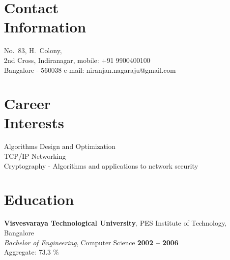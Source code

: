 \documentclass[a4paper,margin,line]{resume}
\begin{document}
\begin{resume}

    \section{\mysidestyle Contact\\Information}

    No.\ 83, H.\ Colony,		                      	\hfill									   \vspace{0mm}\\\vspace{0mm}%
    2nd Cross, Indiranagar,                       	\hfill mobile: +91 9900400100			   \vspace{0mm}\\\vspace{0mm}%
    Bangalore - 560038								\hfill e-mail: niranjan.nagaraju@gmail.com \vspace{0mm}\\\vspace{-4.5mm}%


    \section{\mysidestyle Career\\Interests}

    Algorithms Design and Optimization  \vspace{1mm}\\%
	TCP/IP Networking \vspace{1mm}\\%
	Cryptography - Algorithms and applications to network security


    \section{\mysidestyle Education}

    \textbf{Visvesvaraya Technological University}, PES Institute of Technology, Bangalore \vspace{1mm}\\%
    \textsl{Bachelor of Engineering}, Computer Science \hfill \textbf{2002 -- 2006} \vspace{1mm}\\%
	Aggregate: 73.3 \% \hfill \vspace{0mm}\\\vspace{-4.5mm}%



\end{resume}
\end{document}
